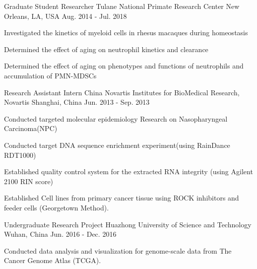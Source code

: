 \begin{cventries}
  \cventry
    {Graduate Student Researcher} %
    {Tulane National Primate Research Center} %
    {New Orleans, LA, USA} %
    {Aug. 2014 - Jul. 2018} %
    {
      \begin{cvitems} %
        \item {Investigated the kinetics of myeloid cells in rhesus macaques during homeostasis}
        \item {Determined the effect of aging on neutrophil kinetics and clearance}
        \item {Determined the effect of aging on phenotypes and functions of neutrophils and accumulation of PMN-MDSCs}
      \end{cvitems}
    }
  \cventry
    {Research Assistant Intern} %
    {China Novartis Institutes for BioMedical Research, Novartis} %
    {Shanghai, China} %
    {Jun. 2013 - Sep. 2013} %
    {
      \begin{cvitems} %
        \item {Conducted targeted molecular epidemiology Research on Nasopharyngeal Carcinoma(NPC)}
        \item {Conducted target DNA sequence enrichment experiment(using RainDance RDT1000)}
        \item {Established quality control system for the extracted RNA integrity (using Agilent 2100 RIN score)}
        \item {Established Cell lines from primary cancer tissue using ROCK inhibitors and feeder cells (Georgetown Method).}
      \end{cvitems}
    }
  \cventry
    {Undergraduate Research Project} %
    {Huazhong University of Science and Technology } %
    {Wuhan, China} %
    {Jun. 2016 - Dec. 2016} %
    {
      \begin{cvitems} %
        \item {Conducted data analysis and visualization for genome-scale data from The Cancer Genome Atlas (TCGA).}
      \end{cvitems}
    }

\end{cventries}